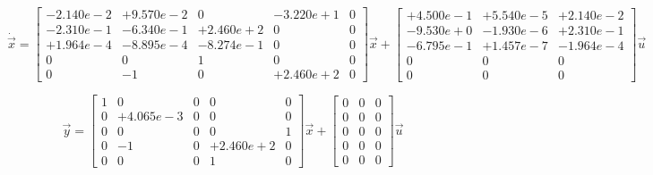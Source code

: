 \documentclass[11pt]{article}
\begin{document}
$$
\dot{\vec{x}} = \left[ \begin{array}{ccccc}
  -2.140e-2 & +9.570e-2 &         0 & -3.220e+1 &         0 \\
  -2.310e-1 & -6.340e-1 & +2.460e+2 &         0 &         0 \\
  +1.964e-4 & -8.895e-4 & -8.274e-1 &         0 &         0 \\
          0 &         0 &         1 &         0 &         0 \\
          0 &        -1 &         0 & +2.460e+2 &         0 \end{array} \right]
\vec{x} + \left[\begin{array}{ccc}
  +4.500e-1 & +5.540e-5 & +2.140e-2 \\
  -9.530e+0 & -1.930e-6 & +2.310e-1 \\
  -6.795e-1 & +1.457e-7 & -1.964e-4 \\
          0 &         0 &         0 \\
          0 &         0 &         0 \end{array}\right] \vec{u}
$$

$$
\vec{y} = \left[ \begin{array}{ccccc}
         1 &         0 &          0 &         0 &         0 \\
         0 & +4.065e-3 &          0 &         0 &         0 \\
         0 &         0 &          0 &         0 &         1 \\
         0 &        -1 &          0 & +2.460e+2 &         0 \\
         0 &         0 &          0 &         1 &         0 \end{array} \right]
\vec{x}+\left[\begin{array}{ccc}
         0 &         0 &          0 \\
         0 &         0 &          0 \\
         0 &         0 &          0 \\
         0 &         0 &          0 \\
         0 &         0 &          0 \end{array}\right]\vec{u}
$$
         
\end{document}
